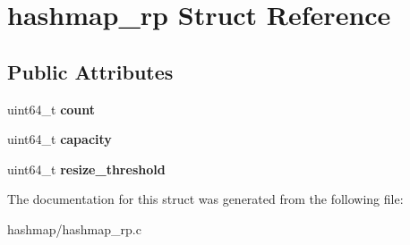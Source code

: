 \hypertarget{structhashmap__rp}{}\section{hashmap\+\_\+rp Struct Reference}
\label{structhashmap__rp}
\subsection*{Public Attributes}
\begin{DoxyCompactItemize}
\item 
\mbox{\label{structhashmap__rp_ab6c1dfb752de6101545bb92dcccc419a}} 
uint64\+\_\+t {\bfseries count}
\item 
\mbox{\label{structhashmap__rp_a964fc2490d30dc7a73328999f7759076}} 
uint64\+\_\+t {\bfseries capacity}
\item 
\mbox{\label{structhashmap__rp_afcf78d28515e6c63cddd440e5b02c79c}} 
uint64\+\_\+t {\bfseries resize\+\_\+threshold}
\end{DoxyCompactItemize}


The documentation for this struct was generated from the following file\+:\begin{DoxyCompactItemize}
\item 
hashmap/hashmap\+\_\+rp.\+c\end{DoxyCompactItemize}
